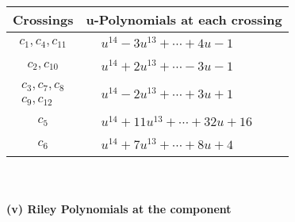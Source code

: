 \documentclass[1p]{elsarticle_modified}
\theoremstyle{definition}
\begin{document}
\begin{tabular}{m{50pt}|m{274pt}}
Crossings & \hspace{64pt}u-Polynomials at each crossing \\
\hline $$\begin{aligned}c_{1},c_{4},c_{11}\end{aligned}$$&$\begin{aligned}
&u^{14}-3 u^{13}+\cdots+4 u-1
\end{aligned}$\\
\hline $$\begin{aligned}c_{2},c_{10}\end{aligned}$$&$\begin{aligned}
&u^{14}+2 u^{13}+\cdots-3 u-1
\end{aligned}$\\
\hline $$\begin{aligned}c_{3},c_{7},c_{8}\\c_{9},c_{12}\end{aligned}$$&$\begin{aligned}
&u^{14}-2 u^{13}+\cdots+3 u+1
\end{aligned}$\\
\hline $$\begin{aligned}c_{5}\end{aligned}$$&$\begin{aligned}
&u^{14}+11 u^{13}+\cdots+32 u+16
\end{aligned}$\\
\hline $$\begin{aligned}c_{6}\end{aligned}$$&$\begin{aligned}
&u^{14}+7 u^{13}+\cdots+8 u+4
\end{aligned}$\\
\hline
\end{tabular}\\~\\
\newpage\renewcommand{\arraystretch}{1}
\flushleft \textbf{(v) Riley Polynomials at the component}\newline \\
\end{document}
